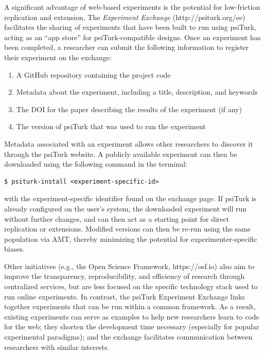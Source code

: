 \documentclass[twocolumn]{svjour3}          %
\newcommand{\psiturk}[0]{\textsf{psiTurk}}
\begin{document}
A significant advantage of web-based experiments is the potential for low-friction replication and extension. 
The \emph{Experiment Exchange} (\textsf{http://psiturk.org/ee}) facilitates the sharing of experiments that have been built to run using \psiturk{}, acting as an ``app store'' for \psiturk{}-compatible designs.
Once an experiment has been completed, a researcher can submit the following information to register their experiment on the exchange:

\begin{enumerate}
\item A GitHub repository containing the project code
\item Metadata about the experiment, including a title, description, and keywords
\item The DOI for the paper describing the results of the experiment (if any)
\item The version of \psiturk{} that was used to run the experiment
\end{enumerate}


Metadata associated with an experiment allows other researchers to discover it through the \psiturk{} website.
A publicly available experiment can then be downloaded using the following command in the terminal:

\begin{lstlisting}
$ psiturk-install <experiment-specific-id>
\end{lstlisting}

\noindent with the experiment-specific identifier found on the exchange page.
If \psiturk{} is already configured on the user's system, the downloaded experiment will run without further changes, and can then act as a starting point for direct replication or extensions.
Modified versions can then be re-run using the same population via AMT, thereby minimizing the potential for experimenter-specific biases.

Other initiatives (e.g., the Open Science Framework, \textsf{https://osf.io}) also aim to improve the transparency, reproducibility, and efficiency of research through centralized services, but are less focused on the specific technology stack used to run online experiments.
In contrast, the \psiturk{} Experiment Exchange links together experiments that can be run within a common framework.
As a result, existing experiments can serve as examples to help new researchers learn to code for the web; they shorten the development time necessary (especially for popular experimental paradigms); and the exchange facilitates communication between researchers with similar interests.
\end{document}
